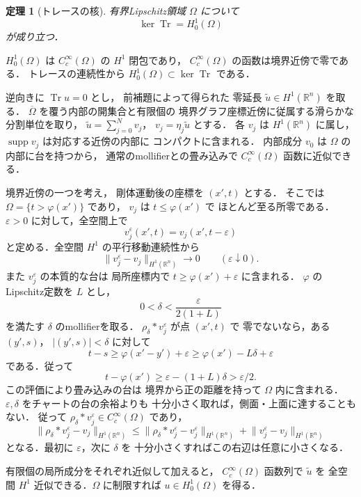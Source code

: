 \documentclass[a5paper,10pt,onecolumn]{jsarticle}
\makeatletter
\theoremstyle{mathnotetheorem}
\newtheorem{theorem}{定理}[section]
\renewcommand{\proofname}{証明}
\renewenvironment{proof}[1][\proofname]{%
  \par\pushQED{\qed}\normalfont\topsep4\p@\@plus2\p@\relax
  \trivlist\item[\hskip\labelsep\bfseries #1]\ignorespaces
}{\popQED\endtrivlist\@endpefalse}
\newcommand{\norm}[1]{\lVert #1\rVert}
\makeatother
\begin{document}
\begin{theorem}[トレースの核]
有界Lipschitz領域 $\Omega$ について
\[
 \ker\operatorname{Tr}=H_0^1(\Omega)
\]
が成り立つ．
\end{theorem}
\begin{proof}
$H_0^1(\Omega)$ は $C_c^\infty(\Omega)$ の
$H^1$ 閉包であり，
$C_c^\infty(\Omega)$ の函数は境界近傍で零である．
トレースの連続性から
$H_0^1(\Omega)\subset\ker\operatorname{Tr}$ である．

逆向きに $\operatorname{Tr}u=0$ とし，
前補題によって得られた
零延長 $\widetilde u\in H^1(\mathbb R^n)$ を取る．
$\overline\Omega$ を覆う内部の開集合と有限個の
境界グラフ座標近傍に従属する滑らかな分割単位を取り，
$\widetilde u=\sum_{j=0}^N v_j$，
$v_j=\eta_j\widetilde u$ とする．
各 $v_j$ は $H^1(\mathbb R^n)$ に属し，
$\operatorname{supp}v_j$ は対応する近傍の内部に
コンパクトに含まれる．
内部成分 $v_0$ は $\Omega$ の内部に台を持つから，
通常のmollifierとの畳み込みで
$C_c^\infty(\Omega)$ 函数に近似できる．

境界近傍の一つを考え，
剛体運動後の座標を $(x',t)$ とする．
そこでは $\Omega=\{t>\varphi(x')\}$ であり，
$v_j$ は $t\le\varphi(x')$ で
ほとんど至る所零である．
$\varepsilon>0$ に対して，全空間上で
\[
 v_j^\varepsilon(x',t)
  =v_j(x',t-\varepsilon)
\]
と定める．全空間 $H^1$ の平行移動連続性から
\[
 \norm{v_j^\varepsilon-v_j}_{H^1(\mathbb R^n)}
 \longrightarrow0\qquad(\varepsilon\downarrow0).
\]
また $v_j^\varepsilon$ の本質的な台は
局所座標内で
$t\ge\varphi(x')+\varepsilon$ に含まれる．
$\varphi$ のLipschitz定数を $L$ とし，
\[
 0<\delta<\frac{\varepsilon}{2(1+L)}
\]
を満たす $\delta$ のmollifierを取る．
$\rho_\delta*v_j^\varepsilon$ が点 $(x',t)$ で
零でないなら，ある $(y',s)$，
$|(y',s)|<\delta$ に対して
\[
 t-s\ge\varphi(x'-y')+\varepsilon
 \ge\varphi(x')-L\delta+\varepsilon
\]
である．従って
\[
 t-\varphi(x')\ge\varepsilon-(1+L)\delta
 >\varepsilon/2.
\]
この評価により畳み込みの台は
境界から正の距離を持って $\Omega$ 内に含まれる．
$\varepsilon,\delta$ をチャートの台の余裕よりも
十分小さく取れば，側面・上面に達することもない．
従って
$\rho_\delta*v_j^\varepsilon\in C_c^\infty(\Omega)$
であり，
\[
 \norm{\rho_\delta*v_j^\varepsilon-v_j}_{H^1(\mathbb R^n)}
 \le
 \norm{\rho_\delta*v_j^\varepsilon-v_j^\varepsilon}_{H^1(\mathbb R^n)}
 +\norm{v_j^\varepsilon-v_j}_{H^1(\mathbb R^n)}
\]
となる．最初に $\varepsilon$，次に $\delta$ を
十分小さくすればこの右辺は任意に小さくなる．

有限個の局所成分をそれぞれ近似して加えると，
$C_c^\infty(\Omega)$ 函数列で $\widetilde u$ を
全空間 $H^1$ 近似できる．$\Omega$ に制限すれば
$u\in H_0^1(\Omega)$ を得る．
\end{proof}
\end{document}
